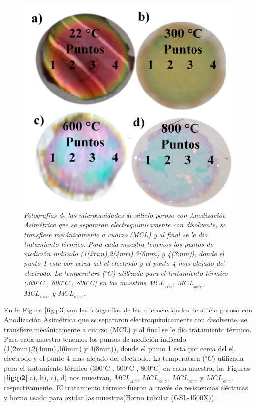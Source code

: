 \documentclass[a4paper,11pt,]{book}
\newcommand{\grad}{$^{\circ}$}
\begin{document}
\begin{figure}[H]
	\centering
	\includegraphics[scale=.15]{../Images/PsiTLa}
	\caption{\emph{Fotografías de las microcavidades de silicio poroso con Anodización Asimétrica que se separaron electroquimicamente con disolvente,  se transfiere mecánicamente a cuarzo (MCL) y al final se le dio tratamiento térmico. Para cada muestra tenemos los puntos de medición indicado (1(2mm),2(4mm),3(6mm) y 4(8mm)), donde el punto 1 esta por cerca del el electrodo y el punto 4 mas alejado del electrodo.  La temperatura ($^{\circ} C$) utilizada para el tratamiento térmico (300\grad C ,  600\grad C ,  800\grad C) en   las  muestras $MCL_{_{21^{\circ} C}}$, $MCL_{_{300^{\circ} C}}$, $MCL_{_{600^{\circ} C}}$ y $MCL_{_{800^{\circ} C}}$.}}
	\label{fig:p7}
\end{figure}
En la Figura \ref{fig:p3} son las fotografías de las microcavidades de silicio poroso con Anodización Asimétrica que se separaron electroquimicamente con disolvente,  se transfiere mecánicamente a cuarzo (MCL) y al final se le dio tratamiento térmico. Para cada muestra tenemos los puntos de medición indicado (1(2mm),2(4mm),3(6mm) y 4(8mm)), donde el punto 1 esta por cerca del el electrodo y el punto 4 mas alejado del electrodo.  La temperatura ($^{\circ} C$) utilizada para el tratamiento térmico (300\grad C ,  600\grad C ,  800\grad C) en cada muestra, las Figuras \textbf{\ref{fig:p2}} a), b), c), d) nos muestran, $MCL_{_{21^{\circ} C}}$,  $MCL_{_{300^{\circ} C}}$,  $MCL_{_{600^{\circ} C}}$ y $MCL_{_{800^{\circ} C}}$, respectivamente. El tratamiento térmico   fueron  a través de resistencias eléctricas y horno usado para oxidar las muestras(Horno tubular (GSL-1500X)).
\end{document}
